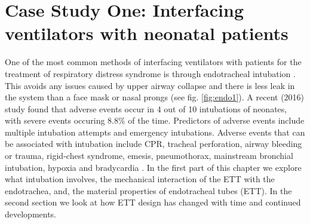 \documentclass[12pt, openany, oneside]{book}
\begin{document}
\chapter{Case Study One: Interfacing ventilators with neonatal patients }

One of the most common methods of interfacing ventilators with patients for the treatment of respiratory distress syndrome is through endotracheal intubation \citep{strong1977endotracheal}. This avoids any issues caused by upper airway collapse and there is less leak in the system than a face mask or nasal prongs (see fig. \ref{fig:endo1}). A recent (2016) study found that adverse events occur in 4 out of 10 intubations of neonates, with severe events occuring 8.8{\%} of the time. Predictors of adverse events include multiple intubation attempts and emergency intubations. Adverse events that can be associated with intubation include CPR, tracheal perforation, airway bleeding or trauma, rigid-chest syndrome, emesis, pneumothorax, mainstream bronchial intubation, hypoxia and bradycardia \cite{hatch2016endotracheal}. In the first part of this chapter we explore what intubation involves, the mechanical interaction of the ETT with the endotrachea, and, the material properties of endotracheal tubes (ETT). In the second section we look at how ETT design has changed with time and continued developments. \\
\end{document}
